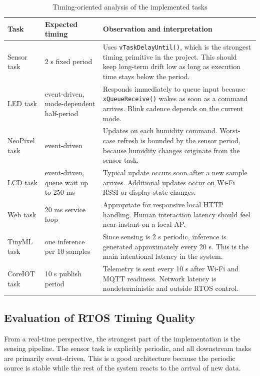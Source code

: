 \begin{table}[!htbp]
\centering
\caption{Timing-oriented analysis of the implemented tasks}
\label{tab:timing-analysis}
\begin{tabular}{p{3cm}p{3.2cm}p{7.8cm}}
\toprule
\textbf{Task} & \textbf{Expected timing} & \textbf{Observation and interpretation} \\
\midrule
Sensor task & 2 s fixed period & Uses \texttt{vTaskDelayUntil()}, which is the strongest timing primitive in the project. This should keep long-term drift low as long as execution time stays below the period. \\
LED task & event-driven, mode-dependent half-period & Responds immediately to queue input because \texttt{xQueueReceive()} wakes as soon as a command arrives. Blink cadence depends on the current mode. \\
NeoPixel task & event-driven & Updates on each humidity command. Worst-case refresh is bounded by the sensor period, because humidity changes originate from the sensor task. \\
LCD task & event-driven, queue wait up to 250 ms & Typical update occurs soon after a new sample arrives. Additional updates occur on Wi-Fi RSSI or display-state changes. \\
Web task & 20 ms service loop & Appropriate for responsive local HTTP handling. Human interaction latency should feel near-instant on a local AP. \\
TinyML task & one inference per 10 samples & Since sensing is 2 s periodic, inference is generated approximately every 20 s. This is the main intentional latency in the system. \\
CoreIOT task & 10 s publish period & Telemetry is sent every 10 s after Wi-Fi and MQTT readiness. Network latency is nondeterministic and outside RTOS control. \\
\bottomrule
\end{tabular}
\end{table}

\subsection{Evaluation of RTOS Timing Quality}
From a real-time perspective, the strongest part of the implementation is the
sensing pipeline. The sensor task is explicitly periodic, and all downstream
tasks are primarily event-driven. This is a good architecture because the
periodic source is stable while the rest of the system reacts to the arrival of
new data.

